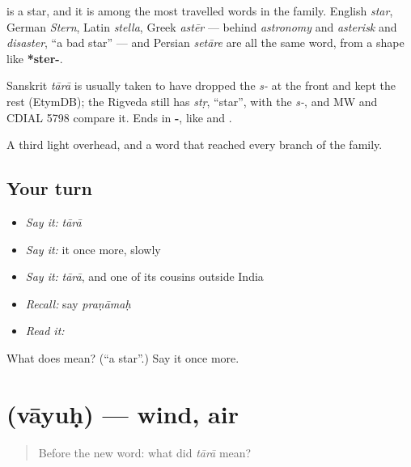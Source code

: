 \textbf{} is a star, and it is among the most travelled words in the family. English \emph{star}, German \emph{Stern}, Latin \emph{stella}, Greek \emph{astēr} — behind \emph{astronomy} and \emph{asterisk} and \emph{disaster}, \textquotedblleft{}a bad star\textquotedblright{} — and Persian \emph{setāre} are all the same word, from a shape like \textbf{*ster-}.

Sanskrit \emph{tārā} is usually taken to have dropped the \emph{s-} at the front and kept the rest (EtymDB); the Rigveda still has \emph{stṛ}, \textquotedblleft{}star\textquotedblright{}, with the \emph{s-}, and MW and CDIAL 5798 compare it. Ends in \textbf{-}, like \textbf{} and \textbf{}.

\begin{grammarlens}[title={What you've built}]
A third light overhead, and a word that reached every branch of the family.
\end{grammarlens}

\subsection*{Your turn}
\begin{itemize}
\raggedright
  \item \emph{Say it:} \emph{tārā}
  \item \emph{Say it:} it once more, slowly
  \item \emph{Say it:} \emph{tārā}, and one of its cousins outside India
  \item \emph{Recall:} say \emph{praṇāmaḥ}
  \item \emph{Read it:} \textbf{}
\end{itemize}

\begin{tcolorbox}[breakable,colback=teal!4,colframe=teal!35!black,title={Before you move on}]
What does  mean? (\textquotedblleft{}a star\textquotedblright{}.) Say it once more.
\end{tcolorbox}
\section[\texorpdfstring{\sk{वायुः} (vāyuḥ)}{वायुः (vāyuḥ)}]{ (vāyuḥ) — wind, air}

\label{lesson:SA-C31-wind}



\begin{quote}
Before the new word: what did \emph{tārā} mean?
\end{quote}

